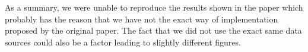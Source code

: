 As a summary, we were unable to reproduce the results shown in the paper which probably has the reason that we have not the exact way of implementation proposed by the original paper.
The fact that we did not use the exact same data sources could also be a factor leading to slightly different figures.
